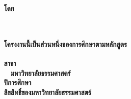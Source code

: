 \pagestyle{empty}
\begin{center}
	\vspace*{40mm}
	\begin{spacing}{1.4}
		\textbf{\huge\titleThai}
	\end{spacing}
	\vspace*{35mm}
	\textbf{โดย}\\
	\vspace*{10mm}
	\textbf{\authorAThai}\\
	\textbf{\authorBThai}\\
	\vfill
	\begin{spacing}{1.3}
		\textbf{โครงงานนี้เป็นส่วนหนึ่งของการศึกษาตามหลักสูตร\\
			\degreeThai \\ สาขา\majorThai\\
			\facultyThai ~ มหาวิทยาลัยธรรมศาสตร์  \\
			ปีการศึกษา \academicYearThai\\ ลิขสิทธิ์ของมหาวิทยาลัยธรรมศาสตร์}
	\end{spacing}
\end{center}
